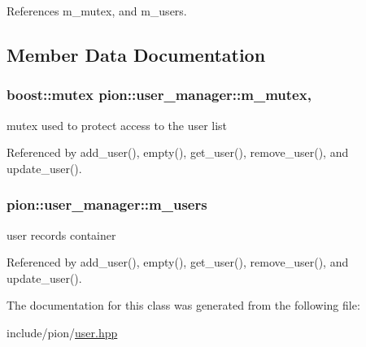 References m\-\_\-mutex, and m\-\_\-users.



\subsection{Member Data Documentation}
\hypertarget{classpion_1_1user__manager_a89489a9cd9499628f9bc764143b06227}{
\subsubsection[{m\-\_\-mutex}]{\setlength{\rightskip}{0pt plus 5cm}boost\-::mutex pion\-::user\-\_\-manager\-::m\-\_\-mutex\hspace{0.3cm}{\ttfamily [mutable]}, {\ttfamily [protected]}}}\label{classpion_1_1user__manager_a89489a9cd9499628f9bc764143b06227}


mutex used to protect access to the user list 



Referenced by add\-\_\-user(), empty(), get\-\_\-user(), remove\-\_\-user(), and update\-\_\-user().

\hypertarget{classpion_1_1user__manager_a366cf3ed44fd3f4bb93f430884934f9d}{
\subsubsection[{m\-\_\-users}]{ pion\-::user\-\_\-manager\-::m\-\_\-users\hspace{0.3cm}{\ttfamily [protected]}}}\label{classpion_1_1user__manager_a366cf3ed44fd3f4bb93f430884934f9d}


user records container 



Referenced by add\-\_\-user(), empty(), get\-\_\-user(), remove\-\_\-user(), and update\-\_\-user().



The documentation for this class was generated from the following file\-:\begin{DoxyCompactItemize}
\item 
include/pion/\hyperlink{user_8hpp}{user.\-hpp}\end{DoxyCompactItemize}
